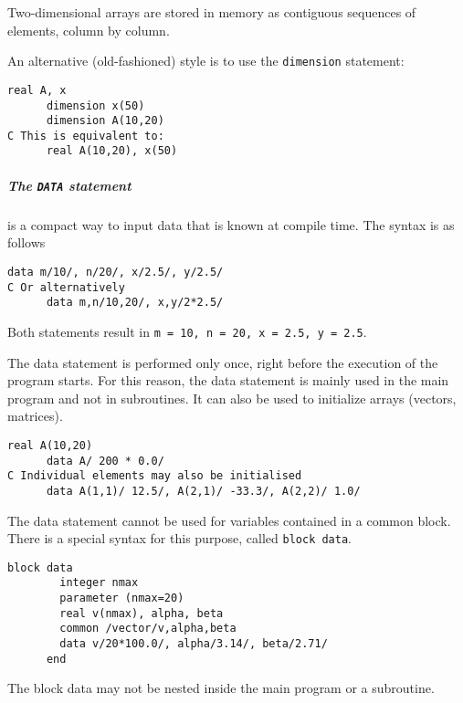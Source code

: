 Two-dimensional arrays are stored in memory as contiguous sequences of elements, column by column.

An alternative (old-fashioned) style is to use the \texttt{dimension} statement:
\begin{lstlisting}[language={[77]fortran}, style=snippet]
      real A, x
      dimension x(50)
      dimension A(10,20)
C This is equivalent to:
      real A(10,20), x(50)
\end{lstlisting}

\subparagraph{The \texttt{DATA} statement} is a compact way to input data that is known at compile time. The syntax is as follows
\begin{lstlisting}[language={[77]fortran}, style=snippet]
      data m/10/, n/20/, x/2.5/, y/2.5/
C Or alternatively
      data m,n/10,20/, x,y/2*2.5/
\end{lstlisting}
Both statements result in \texttt{m = 10, n = 20, x = 2.5, y = 2.5}.

The data statement is performed only once, right before the execution of the program starts. For this reason, the data statement is mainly used in the main program and not in subroutines. It can also be used to initialize arrays (vectors, matrices).
\begin{lstlisting}[language={[77]fortran}, style=snippet]
      real A(10,20)
      data A/ 200 * 0.0/
C Individual elements may also be initialised
      data A(1,1)/ 12.5/, A(2,1)/ -33.3/, A(2,2)/ 1.0/
\end{lstlisting}

The data statement cannot be used for variables contained in a common block. There is a special syntax for this purpose, called \texttt{block data}.
\begin{lstlisting}[language={[77]fortran}, style=snippet]
      block data
        integer nmax
        parameter (nmax=20)
        real v(nmax), alpha, beta
        common /vector/v,alpha,beta
        data v/20*100.0/, alpha/3.14/, beta/2.71/
      end
\end{lstlisting}

The block data may not be nested inside the main program or a subroutine.

